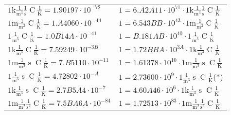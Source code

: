 \begin{center}
\begin{longtable}{l l}
{\color{gray}$1 \bm{\mathrm{ k}}\frac1{\operatorname{m}^3}\frac1{\operatorname{s}}{\operatorname{C}}\frac1{\operatorname{K}} = 1.90197\cdot10^{-72} $}   & {\color{gray}$ 1 = 6.A2A11\cdot10^{71} \cdot 1 \bm{\mathrm{ k}}\frac1{\operatorname{m}^3}\frac1{\operatorname{s}}{\operatorname{C}}\frac1{\operatorname{K}}$}  \\
{\color{gray}$1 \bm{\mathrm{ m}}\frac1{\operatorname{m}^3}{}{\operatorname{C}}\frac1{\operatorname{K}} = 1.A4060\cdot10^{-44} $}   & {\color{gray}$ 1 = 6.543BB\cdot10^{43} \cdot 1 \bm{\mathrm{ m}}\frac1{\operatorname{m}^3}{}{\operatorname{C}}\frac1{\operatorname{K}}$}  \\
{\color{black}$1 \bm{\mathrm{ }}\frac1{\operatorname{m}^3}{}{\operatorname{C}}\frac1{\operatorname{K}} = 1.0B14A\cdot10^{-41} $}   & {\color{black}$ 1 = B.181AB\cdot10^{40} \cdot 1 \bm{\mathrm{ }}\frac1{\operatorname{m}^3}{}{\operatorname{C}}\frac1{\operatorname{K}}$}  \\
{\color{gray}$1 \bm{\mathrm{ k}}\frac1{\operatorname{m}^3}{}{\operatorname{C}}\frac1{\operatorname{K}} = 7.59249\cdot10^{-3B} $}   & {\color{gray}$ 1 = 1.72BBA\cdot10^{3A} \cdot 1 \bm{\mathrm{ k}}\frac1{\operatorname{m}^3}{}{\operatorname{C}}\frac1{\operatorname{K}}$}  \\
{\color{gray}$1 \bm{\mathrm{ m}}\frac1{\operatorname{m}^3}{\operatorname{s}}{\operatorname{C}}\frac1{\operatorname{K}} = 7.B5110\cdot10^{-11} $}   & {\color{gray}$ 1 = 1.61378\cdot10^{10} \cdot 1 \bm{\mathrm{ m}}\frac1{\operatorname{m}^3}{\operatorname{s}}{\operatorname{C}}\frac1{\operatorname{K}}$}  \\
{\color{black}$1 \bm{\mathrm{ }}\frac1{\operatorname{m}^3}{\operatorname{s}}{\operatorname{C}}\frac1{\operatorname{K}} = 4.72802\cdot10^{-A} $}   & {\color{black}$ 1 = 2.73600\cdot10^{9} \cdot 1 \bm{\mathrm{ }}\frac1{\operatorname{m}^3}{\operatorname{s}}{\operatorname{C}}\frac1{\operatorname{K}}$}\quad(*)\\
{\color{gray}$1 \bm{\mathrm{ k}}\frac1{\operatorname{m}^3}{\operatorname{s}}{\operatorname{C}}\frac1{\operatorname{K}} = 2.7B5A4\cdot10^{-7} $}   & {\color{gray}$ 1 = 4.60A46\cdot10^{6} \cdot 1 \bm{\mathrm{ k}}\frac1{\operatorname{m}^3}{\operatorname{s}}{\operatorname{C}}\frac1{\operatorname{K}}$}  \\
{\color{gray}$1 \bm{\mathrm{ m}}\frac1{\operatorname{m}^2}\frac1{\operatorname{s}^2}{\operatorname{C}}\frac1{\operatorname{K}} = 7.5BA6A\cdot10^{-84} $}   & {\color{gray}$ 1 = 1.72513\cdot10^{83} \cdot 1 \bm{\mathrm{ m}}\frac1{\operatorname{m}^2}\frac1{\operatorname{s}^2}{\operatorname{C}}\frac1{\operatorname{K}}$}  \\

\end{longtable}
\end{center}
